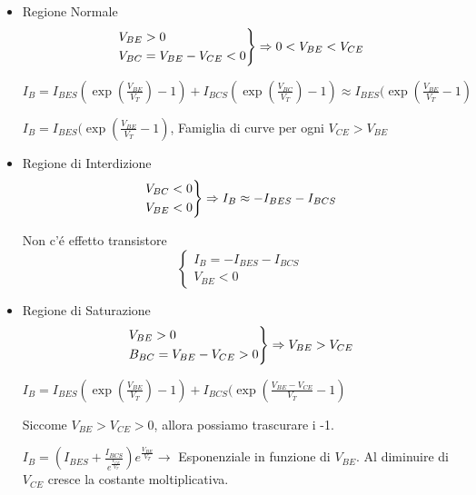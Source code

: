 \documentclass{article}
\begin{document}
\begin{itemize}
    \item Regione Normale
        \[
            \begin{rcases}
                V_{BE} > 0\\
                V_{BC} = V_{BE} - V_{CE} < 0
            \end{rcases}
            \Rightarrow 0 < V_{BE} < V_{CE}
        \]

        $I_B = I_{BES}(\exp(\frac{V_{BE}}{V_T}) -1 ) + I_{BCS} ( \exp(\frac{V_{BC}}{V_T}) - 1) \approx I_{BES} ( \exp(\frac{V_{BE}}{V_T} -1) $

        $I_B =I_{BES} (\exp(\frac{V_{BE}}{V_T}  -1)$, Famiglia di curve per ogni $V_{CE} > V_{BE}$


    \item Regione di Interdizione
        \[
        \begin{rcases}
            V_{BC} < 0 \\
            V_{BE} < 0
        \end{rcases} \Rightarrow I_B \approx -I_{BES} - I_{BCS}
        \]

        Non c'\'e effetto transistore
        \[
            \begin{cases}
                I_B = -I_{BES} - I_{BCS}\\
                V_{BE} < 0
            \end{cases}
        \]
    \item Regione di Saturazione
        \[
            \begin{rcases}
                V_{BE} > 0 \\
                B_{BC} = V_{BE} - V_{CE} > 0
            \end{rcases} \Rightarrow V_{BE} > V_{CE}
        \]

        $I_B = I_{BES}(\exp(\frac{V_{BE}}{V_T}) - 1) + I_{BCS} ( \exp(\frac{V_{BE} - V_{CE}}{V_T} - 1)$

        Siccome $V_{BE} > V_{CE} > 0$, allora possiamo trascurare i -1.

        $I_B = \left(I_{BES} + \frac{I_{BCS}}{e^{\frac{V_{CE}}{V_T}}}\right) e^{\frac{V_{BE}}{V_T}} \rightarrow$ Esponenziale in funzione di $V_{BE}$. Al diminuire di $V_{CE}$ cresce la costante moltiplicativa.

\end{itemize}
\end{document}
